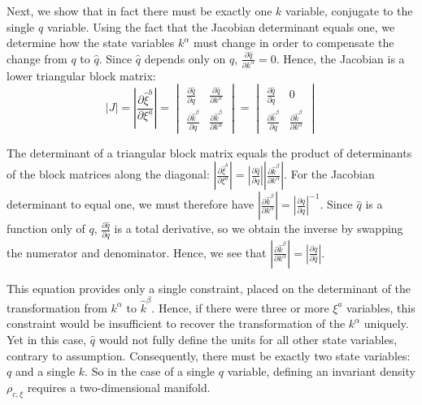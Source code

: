 \documentclass[12pt, english, twoside]{article} %
\begin{document}
Next, we show that in fact there must be exactly one $k$ variable, conjugate to the single $q$ variable. Using the fact that the Jacobian determinant equals one, we determine how the state variables $k^\alpha$ must change in order to compensate the change from $q$ to $\hat q$. Since $\hat{q}$ depends only on $q$, $\frac{\partial \hat{q}}{\partial k^\alpha} = 0$. Hence, the Jacobian is a lower triangular block matrix: 
\begin{equation}
|J| = \left|\frac{\partial \hat{\xi}^b}{\partial \xi^a} \right| = \begin{vmatrix}
\frac{\partial \hat{q}}{\partial q} & \frac{\partial \hat{q}}{\partial k^\alpha} \\
\frac{\partial \hat{k}^\beta}{\partial q} & \frac{\partial \hat{k}^\beta}{\partial  k^\alpha} 
\end{vmatrix} = \begin{vmatrix}
\frac{\partial \hat{q}}{\partial q} & 0 \\
\frac{\partial \hat{k}^\beta}{\partial q} & \frac{\partial \hat{k}^\beta}{\partial  k^\alpha}
\end{vmatrix}
\end{equation}

\noindent
The determinant of a triangular block matrix equals the product of determinants of the block matrices along the diagonal: $ \left|\frac{\partial \hat{\xi}^b}{\partial \xi^a} \right| =  \left|\frac{\partial \hat{q}}{\partial q}\right| \left|\frac{\partial \hat{k}^\beta}{\partial k^\alpha}\right|$. For the Jacobian determinant to equal one, we must therefore have  $\left|\frac{\partial \hat{k}^\beta}{\partial k^\alpha} \right| =   \left|\frac{\partial \hat{q}}{\partial q}\right|^{-1}$. Since $\hat q$ is a function only of $q$, $\frac{\partial \hat{q}}{\partial q}$ is a total derivative, so we obtain the inverse by swapping the numerator and denominator. Hence, we see that $\left|\frac{\partial \hat{k}^\beta}{\partial k^\alpha} \right| = \left|\frac{\partial q}{\partial \hat q} \right|$. 

This equation provides only a single constraint, placed on the determinant of the transformation from $k^\alpha$ to $\hat{k}^\beta$. Hence, if there were three or more $\xi^a$ variables, this constraint would be insufficient to recover the transformation of the $k^\alpha$ uniquely. Yet in this case, $\hat q$  would not fully define the units for all other state variables, contrary to assumption. Consequently, there must be exactly two state variables: $q$ and a single $k$. So in the case of a single $q$ variable, defining an invariant density $\rho_{c, \xi}$ requires a two-dimensional manifold.
\end{document}
